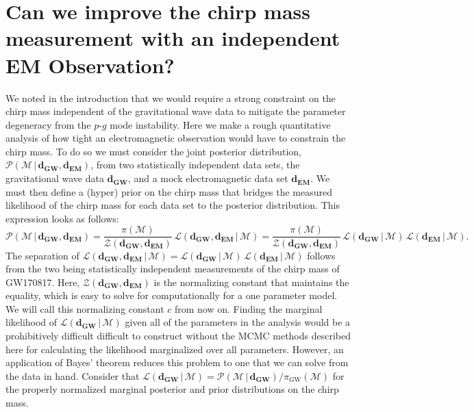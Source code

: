 \section{Can we improve the chirp mass measurement with an independent EM Observation?}
We noted in the introduction that we would require a strong constraint on the chirp mass independent of the gravitational wave data to mitigate the parameter degeneracy from the $p$-$g$ mode instability. Here we make a rough quantitative analysis of how tight an electromagnetic observation would have to constrain the chirp mass. To do so we must consider the joint posterior distribution, $\mathcal{P}(\mathcal{M} \, | \,  \mathbf{d_{GW}}, \mathbf{d_{EM}})$, from two statistically independent data sets, the gravitational wave data $\mathbf{d_{GW}}$, and a mock electromagnetic data set $\mathbf{d_{EM}}$. We must then define a (hyper) prior on the chirp mass that bridges the measured likelihood of the chirp mass for each data set to the posterior distribution. This expression looks as follows:
\begin{equation}
    \mathcal{P}(\mathcal{M} \, | \,  \mathbf{d_{GW}}, \mathbf{d_{EM}}) = \frac{\pi(\mathcal{M})}{\mathcal{Z}(\mathbf{d_{GW}}, \mathbf{d_{EM}})}  \,  \mathcal{L}(\mathbf{d_{GW}}, \mathbf{d_{EM}} \, | \, \mathcal{M}) = \frac{\pi(\mathcal{M})}{\mathcal{Z}(\mathbf{d_{GW}}, \mathbf{d_{EM}})} \, \mathcal{L}(\mathbf{d_{GW}} \, | \, \mathcal{M}) \, \mathcal{L}(\mathbf{d_{EM}} \, | \, \mathcal{M}).
\end{equation}
The separation of $\mathcal{L}(\mathbf{d_{GW}}, \mathbf{d_{EM}} \, | \, \mathcal{M}) = \mathcal{L}(\mathbf{d_{GW}} \, | \, \mathcal{M}) \, \mathcal{L}(\mathbf{d_{EM}} \, | \, \mathcal{M})$ follows from the two being statistically independent measurements of the chirp mass of GW170817. Here, $\mathcal{Z}(\mathbf{d_{GW}}, \mathbf{d_{EM}})$ is the normalizing constant that maintains the equality, which is easy to solve for computationally for a one parameter model. We will call this normalizing constant $c$ from now on. Finding the marginal likelihood of $\mathcal{L}(\mathbf{d_{GW}} \, | \, \mathcal{M})$ given all of the parameters in the analysis would be a prohibitively difficult difficult to construct without the MCMC methods described here for calculating the likelihood marginalized over all parameters. However, an application of Bayes' theorem reduces this problem to one that we can solve from the data in hand. Consider that $\mathcal{L}(\mathbf{d_{GW}} \, | \, \mathcal{M}) = \mathcal{P}(\mathcal{M} \, | \, \mathbf{d_{GW}}) / \pi_{\mathrm{GW}} (\mathcal{M})$ for the properly normalized marginal posterior and prior distributions on the chirp mass.

